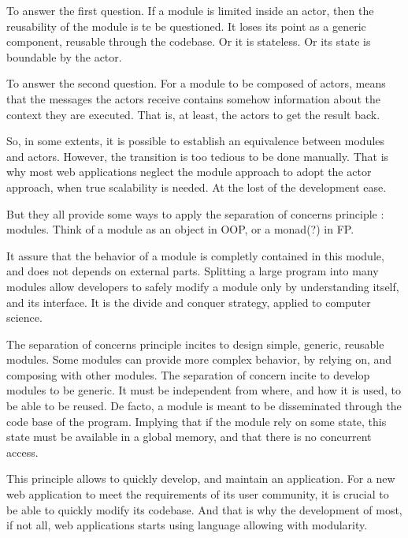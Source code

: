 To answer the first question.
If a module is limited inside an actor, then the reusability of the module is te be questioned.
It loses its point as a generic component, reusable through the codebase.
Or it is stateless.
Or its state is boundable by the actor.

To answer the second question.
For a module to be composed of actors, means that the messages the actors receive contains somehow information about the context they are executed.
That is, at least, the actors to get the result back.

So, in some extents, it is possible to establish an equivalence between modules and actors. However, the transition is too tedious to be done manually.
That is why most web applications neglect the module approach to adopt the actor approach, when true scalability is needed.
At the lost of the development ease.


But they all provide some ways to apply the separation of concerns principle : modules.
Think of a module as an object in OOP, or a monad(?) in FP.

It assure that the behavior of a module is completly contained in this module, and does not depends on external parts.
Splitting a large program into many modules allow developers to safely modify a module only by understanding itself, and its interface.
It is the divide and conquer strategy, applied to computer science.

The separation of concerns principle incites to design simple, generic, reusable modules. 
Some modules can provide more complex behavior, by relying on, and composing with other modules.
The separation of concern incite to develop modules to be generic.
It must be independent from where, and how it is used, to be able to be reused.
De facto, a module is meant to be disseminated through the code base of the program.
Implying that if the module rely on some state, this state must be available in a global memory, and that there is no concurrent access.

This principle allows to quickly develop, and maintain an application.
For a new web application to meet the requirements of its user community, it is crucial to be able to quickly modify its codebase.
And that is why the development of most, if not all, web applications starts using language allowing with modularity.


